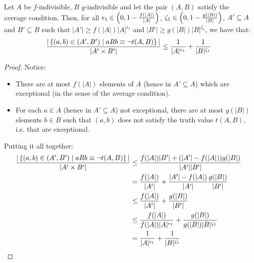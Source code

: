 
    \begin{lemma} \label{exceptions_bound_of_f_indivisible_sets}
        Let $A$ be $f$-indivisible, $B$ $g$-indivisible and let the pair $(A,B)$ satisfy the average condition.
        Then, for all $\epsilon_1 \in \left( 0, 1-\frac{f(|A|)}{|A|} \right)$, $\zeta_1 \in \left( 0, 1-\frac{g(|B|)}{|B|} \right)$, $A' \subseteq A$
            and $B' \subseteq B$ such that $|A'| \geq f(|A|) |A|^{\epsilon_1}$ and $|B'| \geq g(|B|) |B|^{\zeta_1}$,
            we have that:
        \[
            \frac{|\left\{ (a,b) \in (A',B') \mid a R b \equiv \neg t(A,B) \right\}|}{|A' \times B'|} \leq
                \frac{1}{|A|^{\epsilon_1}} + \frac{1}{|B|^{\zeta_1}}
        \]
        \begin{proof}
            Notice:
            \begin{itemize}
                \item There are at most $f(|A|)$ elements of $A$ (hence in $A' \subseteq A$) which are exceptional
                    (in the sense of the average condition).
                \item For each $a \in A$ (hence in $A' \subseteq A$) not exceptional, there are at most $g(|B|)$ elements
                    $b \in B$ such that $(a,b)$ does not satisfy the truth value $t(A,B)$, i.e. that are exceptional.
            \end{itemize}
            Putting it all together:
            \[
                \begin{split}
                    \frac{|\left\{ (a,b) \in (A',B') \mid a R b \equiv \neg t(A,B) \right\}|}{|A' \times B'|}
                        &\leq \frac{f(|A|) |B'| + (|A'| - f(|A|)) g(|B|)}{|A'| |B'|} \\
                        &= \frac{f(|A|)}{|A'|} + \frac{|A'| - f(|A|)}{|A'|} \frac{g(|B|)}{|B'|} \\
                        &\leq \frac{f(|A|)}{|A'|} + \frac{g(|B|)}{|B'|} \\
                        &\leq \frac{f(|A|)}{f(|A|) |A|^{\epsilon_1}} + \frac{g(|B|)}{g(|B|) |B|^{\zeta_1}} \\
                        &= \frac{1}{|A|^{\epsilon_1}} + \frac{1}{|B|^{\zeta_1}}
                \end{split}
            \]
        \end{proof}
    \end{lemma}

